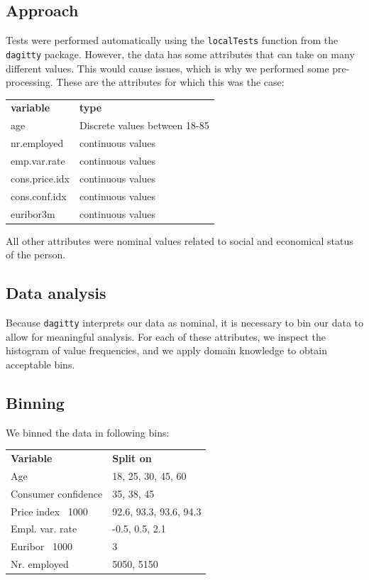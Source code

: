 \documentclass[11pt]{article}
\begin{document}
\begin{multicols}{2}
\section{Approach}
Tests were performed automatically using the \texttt{localTests} function from
the \texttt{dagitty} package.  However, the data has some attributes that can
take on many different values. This would cause issues, which is why we performed some pre-processing. These are the attributes for which this was the case:

\medskip
\begin{tabular}{ll}
    \textbf{variable} & \textbf{type} \\
    age & Discrete values between 18-85 \\
    nr.employed & continuous values \\
    emp.var.rate & continuous values \\
    cons.price.idx & continuous values \\
    cons.conf.idx & continuous values \\
    euribor3m & continuous values \\
\end{tabular}

\medskip
\noindent All other attributes were nominal values related to social and economical status of the person.

\subsection{Data analysis}
Because \texttt{dagitty} interprets our data as nominal, it is necessary to bin
our data to allow for meaningful analysis. For each of these attributes, we
inspect the histogram of value frequencies, and we apply domain knowledge to obtain
acceptable bins.

\subsection{Binning}
We binned the data in following bins:

\medskip
\begin{tabular}{ll}
	\textbf{Variable}           & \textbf{Split on} \\
	Age                         & 18, 25, 30, 45, 60 \\
	Consumer confidence         & 35, 38, 45 \\
	Price index \ 1000          & 92.6, 93.3, 93.6, 94.3 \\
	Empl. var. rate             & -0.5, 0.5, 2.1 \\
	Euribor \ 1000              & 3 \\
	Nr. employed                & 5050, 5150 \\
\end{tabular}


\end{multicols}
\end{document}
